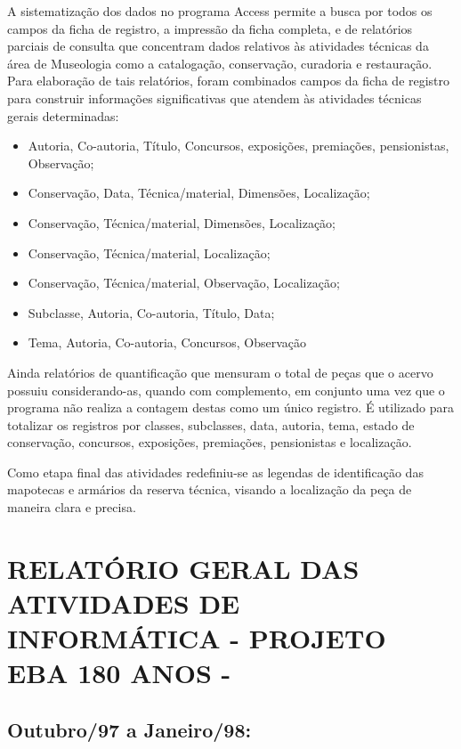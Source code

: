 A sistematização dos dados no programa Access permite a busca por todos os campos da ficha de registro, a impressão da ficha completa, e de relatórios parciais de consulta que concentram dados relativos às atividades técnicas da área de Museologia como a catalogação, conservação, curadoria e restauração. Para elaboração de tais relatórios, foram combinados campos da ficha de registro para construir informações significativas que atendem às atividades técnicas gerais determinadas:

\begin{itemize}
	
	\item Autoria, Co-autoria, Título, Concursos, exposições, premiações, pensionistas, Observação;
	\item Conservação, Data, Técnica/material, Dimensões, Localização;
	\item Conservação, Técnica/material, Dimensões, Localização;
	\item Conservação, Técnica/material, Localização;
	\item Conservação, Técnica/material, Observação, Localização;
	\item Subclasse, Autoria, Co-autoria, Título, Data;
	\item Tema, Autoria, Co-autoria, Concursos, Observação
\end{itemize}

Ainda relatórios de quantificação que mensuram o total de peças que o acervo possuiu considerando-as, quando com complemento, em conjunto uma vez que o programa não realiza a contagem destas como um único registro. É utilizado para totalizar os registros por classes, subclasses, data, autoria, tema, estado de conservação, concursos, exposições, premiações, pensionistas e localização.

Como etapa final das atividades redefiniu-se as legendas de identificação das mapotecas e armários da reserva técnica, visando a localização da peça de maneira clara e precisa.

\section{RELATÓRIO GERAL DAS ATIVIDADES DE INFORMÁTICA - PROJETO EBA 180 ANOS -}

\subsection{Outubro/97 a Janeiro/98:}

